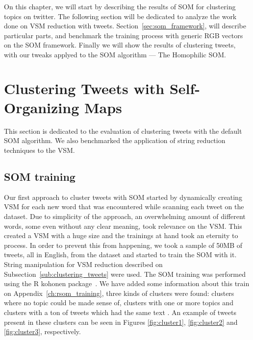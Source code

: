 \label{ch:eval_met}
On this chapter, we will start by describing the results of \ac{SOM} for clustering topics on twitter. The following section will be dedicated to analyze the work done on \ac{VSM} reduction with tweets.
Section~\ref{sec:som_framework}, will describe particular parts, and benchmark the training process with generic RGB vectors on the \ac{SOM} framework. Finally we will show the results of clustering tweets, with our tweaks applyed to the \ac{SOM} algorithm --- The Homophilic \ac{SOM}.

\section{Clustering Tweets with Self-Organizing Maps}
\label{sec:clustering_tbla}
This section is dedicated to the evaluation of clustering tweets with the default \ac{SOM} algorithm. We also benchmarked the application of string reduction techniques to the \ac{VSM}.  

\subsection{SOM training}
\label{sub:clustering_tweets_with_soms}
Our first approach to cluster tweets with \ac{SOM} started by dynamically creating \ac{VSM} for each new word that was encountered while scanning each tweet on the dataset. Due to simplicity of the approach, an overwhelming amount of different words, some even without any clear meaning, took relevance on the \ac{VSM}. 
This created a \ac{VSM} with a huge size and the trainings at hand took an eternity to process. In order to prevent this from happening, we took a sample of 50MB of tweets, all in English, from the dataset and started to train the \ac{SOM} with it. String manipulation for \ac{VSM} reduction described on Subsection~\ref{sub:clustering_tweets} were used.
The \ac{SOM} training was performed using the R kohonen package~\cite{rsom}. We have added some information about this train on Appendix~\ref{ch:rsom_training}, three kinds of clusters were found: clusters where no topic could be made sense of, clusters with one or more topics and clusters with a ton of tweets which had the same text . An example of tweets present in these clusters can be seen in Figures \ref{fig:cluster1}, \ref{fig:cluster2} and \ref{fig:cluster3}, respectively.  

